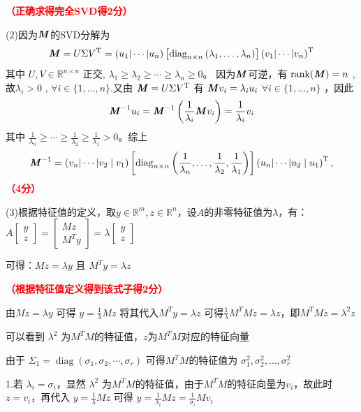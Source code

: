 \documentclass[12pt,a4paper,openany,twoside]{ctexbook}
\begin{document}
\begin{Solution}
\hfill \textcolor{red}{\textbf{（正确求得完全SVD得2分）}}

(2)因为$\boldsymbol{\mathit{M}}$的SVD分解为
$$
\boldsymbol{\mathit{M}}=U \Sigma V^{\mathrm{T}}=\left(u_1|\cdots| u_n\right)\left[\operatorname{diag}_{n \times n}\left(\lambda_1, \ldots, \lambda_n\right)\right]\left(v_1|\cdots| v_n\right)^{\mathrm{T}}
$$
其中 $U, V \in \mathbb{R}^{n \times n}$ 正交, $\lambda_1 \geq \lambda_2 \geq \cdots \geq \lambda_n \geq 0$。 因为$\boldsymbol{\mathit{M}}$可逆，有 $\operatorname{rank}(\boldsymbol{\mathit{M}})=n$ , 故$\lambda_i>0$ , $\forall i \in\{1, \ldots, n\}$.又由 $\boldsymbol{\mathit{M}}=U \Sigma V^{\mathrm{T}}$ 有 $\boldsymbol{\mathit{M}} v_i=\lambda_i u_i$ $\forall i \in\{1, \ldots, n\}$ ，因此 
$$\boldsymbol{\mathit{M}}^{-1} u_i=\boldsymbol{\mathit{M}}^{-1}\left(\frac{1}{\lambda_i} \boldsymbol{\mathit{M}} v_i\right)=\frac{1}{\lambda_i} v_i$$
其中 $\frac{1}{\lambda_n} \geq \cdots \geq \frac{1}{\lambda_2} \geq \frac{1}{\lambda_1}>0$。综上
$$
\boldsymbol{\mathit{M}}^{-1}=\left(v_n|\cdots| v_2 \mid v_1\right)\left[\operatorname{diag}_{n \times n}\left(\frac{1}{\lambda_n}, \ldots, \frac{1}{\lambda_2}, \frac{1}{\lambda_1}\right)\right]\left(u_n|\cdots| u_2 \mid u_1\right)^{\mathrm{T}},
$$
\hfill \textcolor{red}{\textbf{（4分）}}

(3)根据特征值的定义，取$ y\in \mathbb{R}^{m},z\in \mathbb{R}^{n} $，设$A$的非零特征值为$\lambda$，有：$A
\begin{bmatrix}
y \\
z 
\end{bmatrix}
=
\begin{bmatrix}
Mz \\
M^Ty 
\end{bmatrix}
=
\lambda
\begin{bmatrix}
y \\
z 
\end{bmatrix}$

可得：$Mz=\lambda y$ 且 $M^Ty= \lambda z$

\hfill \textcolor{red}{\textbf{（根据特征值定义得到该式子得2分）}}

由$Mz=\lambda y$ 可得 $y=\frac{1}{\lambda}Mz$ 将其代入$M^Ty= \lambda z$ 可得$\frac{1}{\lambda} M^TMz=\lambda z$，即$M^TMz={\lambda}^2 z$

可以看到 ${\lambda}^2$ 为$M^TM$的特征值，$z$为$M^TM$对应的特征向量

由于 $\Sigma_1 = \operatorname{diag}(\sigma_1, \sigma_2, \cdots, \sigma_r)$ 可得$M^TM$的特征值为 $\sigma_1^2,\sigma_2^2,...,\sigma_r^2$

1.若 $\lambda_i=\sigma_i$，显然 ${\lambda}^2$ 为$M^TM$的特征值，由于$M^TM$的特征向量为$v_i$，故此时$z=v_i$，再代入 $y=\frac{1}{\lambda}Mz$ 可得 $y=\frac{1}{\lambda_i}Mz=\frac{1}{\sigma_i}Mv_i$


\end{Solution}
\end{document}

